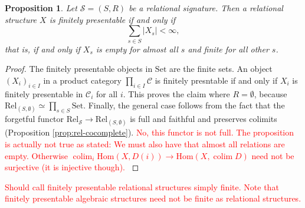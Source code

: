 \documentclass[a4paper]{article}
\newcommand{\todo}[1]{\textcolor{red}{#1}}
\newtheorem{proposition}[theorem]{Proposition}
\theoremstyle{remark}
\theoremstyle{definition}
\begin{document}
\begin{proposition}
  Let $\mathcal{S} = (S, R)$ be a relational signature.
  Then a relational structure $X$ is finitely presentable if and only if
  \begin{equation}
    \sum_{s \in S} |X_s| < \infty,
  \end{equation}
  that is, if and only if $X_s$ is empty for almost all $s$ and finite for all other $s$.
\end{proposition}
\begin{proof}
  The finitely presentable objects in $\mathrm{Set}$ are the finite sets.
  An object $(X_i)_{i \in I}$ in a product category $\prod_{i \in I} \mathcal{C}$ is finitely presntable if and only if $X_i$ is finitely presentable in $\mathcal{C}_i$ for all $i$.
  This proves the claim where $R = \emptyset$, because $\mathrm{Rel}_{(S, \emptyset)} \simeq \prod_{s \in S} \mathrm{Set}$.
  Finally, the general case follows from the fact that the forgetful functor $\mathrm{Rel}_\mathcal{S} \rightarrow \mathrm{Rel}_{(S, \emptyset)}$ is full and faithful and preserves colimits (Proposition \ref{prop:rel-cocomplete}).
  \todo{
    No, this functor is not full.
    The proposition is actually not true as stated:
    We must also have that almost all relations are empty.
    Otherwise $\operatorname{colim}_i \mathrm{Hom}(X, D(i)) \rightarrow \mathrm{Hom}(X, \operatorname{colim} D)$ need not be surjective (it is injective though).
  }
\end{proof}
\todo{
  Should call finitely presentable relational structures simply finite.
  Note that finitely presentable algebraic structures need not be finite as relational structures.
}
\end{document}
